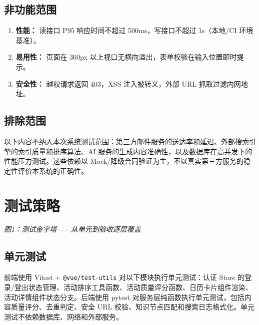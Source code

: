 \documentclass[12pt,a4paper]{ctexart}
\begin{document}
\subsection{非功能范围}
\begin{enumerate}
\item \textbf{性能：} 读接口 P95 响应时间不超过 500ms，写接口不超过 1s（本地/CI 环境基准）。
\item \textbf{易用性：} 页面在 360px 以上视口无横向溢出，表单校验在输入位置即时提示。
\item \textbf{安全性：} 越权请求返回 403，XSS 注入被转义，外部 URL 抓取过滤内网地址。
\end{enumerate}

\subsection{排除范围}
以下内容不纳入本次系统测试范围：第三方邮件服务的送达率和延迟、外部搜索引擎的索引质量和排序算法、AI 服务的生成内容准确性，以及数据库在高并发下的性能压力测试。这些依赖以 Mock/降级合同验证为主，不以真实第三方服务的稳定性评价本系统的正确性。

\section{测试策略}
\begin{center}
\vspace{0.2em}
{\par\small\itshape 图1：测试金字塔——从单元到验收逐层覆盖}
\end{center}

\subsection{单元测试}
前端使用 Vitest + \texttt{@vue/test-utils} 对以下模块执行单元测试：认证 Store 的登录/登出状态管理、活动排序工具函数、活动质量评分函数、日历卡片组件渲染、活动详情组件状态分支。后端使用 pytest 对服务层纯函数执行单元测试，包括内容质量评分、去重判定、安全 URL 校验、知识节点匹配和搜索日志格式化。单元测试不依赖数据库、网络和外部服务。
\end{document}
